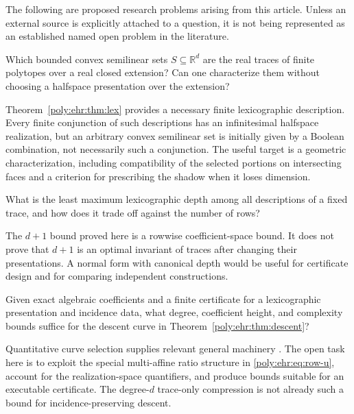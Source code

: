 \documentclass[11pt,a4paper]{article}
\numberwithin{equation}{section}
\theoremstyle{plain}
\newcommand{\R}{\mathbb R}
\begin{document}
The following are proposed research problems arising from this article.
Unless an external source is explicitly attached to a question, it is not
being represented as an established named open problem in the literature.

\begin{question}\label{poly:ehr:q:intrinsic}
Which bounded convex semilinear sets $S\subseteq\R^d$ are the real traces
of finite polytopes over a real closed extension? Can one characterize them
without choosing a halfspace presentation over the extension?
\end{question}
Theorem~\ref{poly:ehr:thm:lex} provides a necessary finite lexicographic description.
Every finite conjunction of such descriptions has an infinitesimal
halfspace realization, but an arbitrary convex semilinear set is initially
given by a Boolean combination, not necessarily such a conjunction.
The useful target is a geometric characterization, including compatibility
of the selected portions on intersecting faces and a criterion for
prescribing the shadow when it loses dimension.

\begin{question}
What is the least maximum lexicographic depth among all descriptions of a
fixed trace, and how does it trade off against the number of rows?
\end{question}
The $d+1$ bound proved here is a rowwise coefficient-space bound. It does
not prove that $d+1$ is an optimal invariant of traces after changing their
presentations. A normal form with canonical depth would be useful for
certificate design and for comparing independent constructions.

\begin{question}
Given exact algebraic coefficients and a finite certificate for a
lexicographic presentation and incidence data, what degree, coefficient
height, and complexity bounds suffice for the descent curve in
Theorem~\ref{poly:ehr:thm:descent}?
\end{question}
Quantitative curve selection supplies relevant general machinery
\cite{ehr:basu-roy}. The open task here is to exploit the special multi-affine
ratio structure in \eqref{poly:ehr:eq:row-u}, account for the realization-space
quantifiers, and produce bounds suitable for an executable certificate.
The degree-$d$ trace-only compression is not already such a bound for
incidence-preserving descent.
\end{document}
